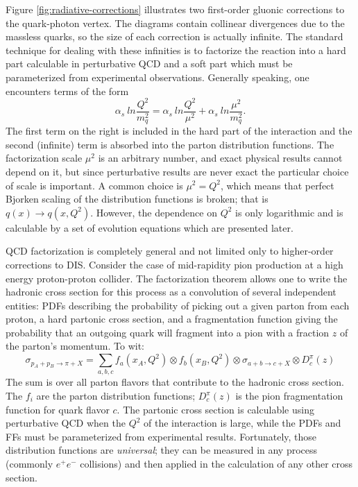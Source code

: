 Figure \ref{fig:radiative-corrections} illustrates two first-order gluonic
corrections to the quark-photon vertex. The diagrams contain collinear
divergences due to the massless quarks, so the size of each correction is
actually infinite. The standard technique for dealing with these infinities is
to factorize the reaction into a hard part calculable in perturbative QCD and a
soft part which must be parameterized from experimental observations. Generally
speaking, one encounters terms of the form
%
\begin{equation}
  \alpha_s~ln \frac{Q^2}{m_q^2} = \alpha_s~ln \frac{Q^2}{\mu^2} + \alpha_s~ln \frac{\mu^2}{m_q^2}.
\end{equation}
%
The first term on the right is included in the hard part of the interaction and
the second (infinite) term is absorbed into the parton distribution functions.
The factorization scale \(\mu^2\) is an arbitrary number, and exact physical
results cannot depend on it, but since perturbative results are never exact the
particular choice of scale is important. A common choice is
\(\mu^2 = Q^2\), which means that perfect Bjorken scaling of the distribution
functions is broken; that is \(q(x) \rightarrow q(x,Q^2)\). However, the
dependence on \(Q^2\) is only logarithmic and is calculable by a set of
evolution equations which are presented later.

QCD factorization is completely general and not limited only to higher-order
corrections to DIS. Consider the case of mid-rapidity pion production at a high
energy proton-proton collider. The factorization theorem allows one to write the
hadronic cross section for this process as a convolution of several independent
entities: PDFs describing the probability of picking out a given parton from
each proton, a hard partonic cross section, and a fragmentation function giving
the probability that an outgoing quark will fragment into a pion with a fraction
\(z\) of the parton's momentum. To wit:
%
\begin{equation}
  \sigma_{p_A+p_B \rightarrow \pi+X} = \sum_{a,b,c} f_a(x_A, Q^2) \otimes f_b(x_B, Q^2) \otimes \sigma_{a+b \rightarrow c + X} \otimes D_c^{\pi}(z)
  \label{eqn:factorization}
\end{equation}
%
The sum is over all parton flavors that contribute to the hadronic cross
section. The \(f_i\) are the parton distribution functions; \(D_c^{\pi}(z)\) is
the pion fragmentation function for quark flavor \(c\). The partonic cross
section is calculable using perturbative QCD when the \(Q^2\) of the interaction
is large, while the PDFs and FFs must be parameterized from experimental
results. Fortunately, those distribution functions are \textit{universal}; they
can be measured in any process (commonly \(e^+e^-\) collisions) and then applied
in the calculation of any other cross section. %

